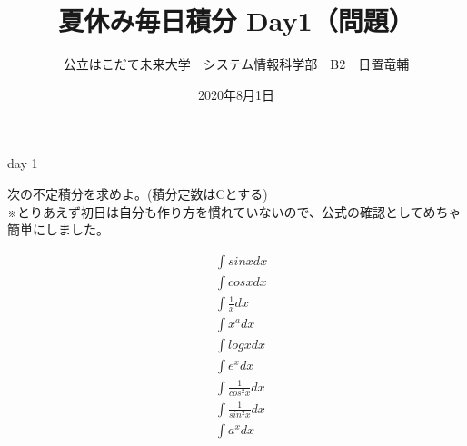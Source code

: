 \documentclass[dvipdfmx,uplatex]{jsarticle}
\title{夏休み毎日積分 Day1（問題）}
\author{公立はこだて未来大学　システム情報科学部　B2　日置竜輔}
\date{2020年8月1日}
\begin{document}
\maketitle

\begin{itembox}[c]{day 1 }
    \begin{center}
        次の不定積分を求めよ。\quad (積分定数はCとする)\\
        ※とりあえず初日は自分も作り方を慣れていないので、公式の確認としてめちゃ簡単にしました。
    \end{center}
\end{itembox}
\begin{align*}
    &\int sinx dx \\
    &\int cosx dx \\
    &\int \frac{1}{x} dx \\
    &\int x^a dx \\
    &\int logx dx \\
    &\int e^x dx \\
    &\int \frac{1}{cos^2x} dx \\
    &\int \frac{1}{sin^2x} dx \\
    &\int a^x dx
\end{align*}
\end{document}
